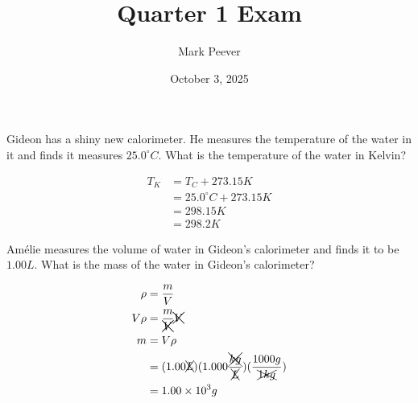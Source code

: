 \documentclass[11pt,addpoints]{exam}   	%
\title{Quarter 1 Exam}
\author{Mark Peever}
\date{October 3, 2025}							%
\begin{document}
\maketitle

\pointsinrightmargin
\printanswers

\begin{center}
\end{center}
\vspace{0.1in}
\vspace{0.2in}

\begin{questions}
\question[5] Gideon has a shiny new calorimeter. He measures the temperature of the water in it and finds it measures  $25.0^{\circ}C$. What is the temperature of the water in Kelvin? 
\begin{solution}
\begin{equation} 
\begin{split}
    T_K &= T_C + 273.15 K \\
            &= 25.0^{\circ}C + 273.15 K \\
            &= 298.15 K \\
            &= 298.2 K                                       
 \end{split}
 \end{equation}
 \end{solution}

\question[5] Am\'{e}lie measures the volume of water in Gideon's calorimeter and finds it to be $1.00 L$. What is the mass of the water in Gideon's calorimeter?
\begin{solution}
\begin{equation} 
\begin{split}
  \rho &= \frac{m}{V} \\
  V \rho &= \frac{m}{\xcancel{V}} \xcancel{V} \\
  m &= V \rho \\
      &= (1.00 \xcancel{L}) (1.000 \frac{\xcancel{kg}}{\xcancel{L}}) (\frac{1000 g}{\xcancel{1 kg}}) \\
      &= 1.00 \times 10^3 g                                 
 \end{split}
 \end{equation}
 \end{solution}


\end{questions}
\end{document}
